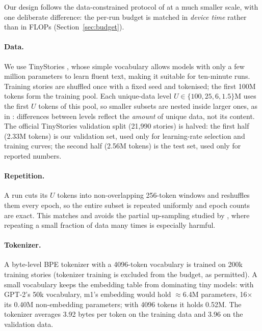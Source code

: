 \documentclass[11pt]{article}
\begin{document}
Our design follows the data-constrained protocol of \citet{muennighoff2023scaling} at a much smaller
scale, with one deliberate difference: the per-run budget is matched in \emph{device time} rather than
in FLOPs (Section~\ref{sec:budget}).

\paragraph{Data.}
We use TinyStories \citep{eldan2023tinystories}, whose simple vocabulary allows models with only a few
million parameters to learn fluent text, making it suitable for ten-minute runs. Training stories are
shuffled once with a fixed seed and tokenised; the first 100M tokens form the training pool.
Each unique-data level $U\in\{100,25,6,1.5\}$M uses the first $U$ tokens of this pool, so smaller
subsets are nested inside larger ones, as in \citet[Fig.~2]{muennighoff2023scaling}: differences
between levels reflect the \emph{amount} of unique data, not its content. The official TinyStories
validation split (21{,}990 stories) is halved: the first half (2.33M tokens) is our validation set, used
only for learning-rate selection and training curves; the second half (2.56M tokens) is the test set,
used only for reported numbers.

\paragraph{Repetition.}
A run cuts its $U$ tokens into non-overlapping 256-token windows and reshuffles them every epoch, so
the entire subset is repeated uniformly and epoch counts are exact. This matches
\citet{muennighoff2023scaling} and avoids the partial up-sampling studied by
\citet{hernandez2022repeated}, where repeating a small fraction of data many times is especially harmful.

\paragraph{Tokenizer.}
A byte-level BPE tokenizer \citep{radford2019gpt2} with a 4096-token vocabulary is trained on 200k
training stories (tokenizer training is excluded from the budget, as permitted). A small vocabulary
keeps the embedding table from dominating tiny models: with GPT-2's 50k vocabulary, m1's embedding
would hold $\approx$6.4M parameters, 16$\times$ its 0.40M non-embedding parameters; with 4096 tokens it
holds 0.52M. The tokenizer averages 3.92 bytes per token on the training data and 3.96 on the validation data.
\end{document}
